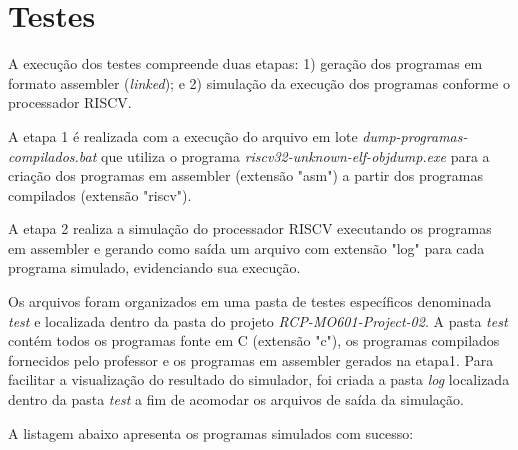 
\section{Testes}

A execução dos testes compreende duas etapas: 1) geração dos programas em formato assembler (\textit{linked}); e 2) simulação da execução dos programas conforme o processador RISCV.

A etapa 1 é realizada com a execução do arquivo em lote \textit{dump-programas-compilados.bat} que utiliza o programa \textit{riscv32-unknown-elf-objdump.exe} para a criação dos programas em assembler (extensão "asm") a partir dos programas compilados (extensão "riscv").

A etapa 2 realiza a simulação do processador RISCV executando os programas em assembler e gerando como saída um arquivo com extensão "log" para cada programa simulado, evidenciando sua execução.

Os arquivos foram organizados em uma pasta de testes específicos denominada \textit{test} e localizada dentro da pasta do projeto \textit{RCP-MO601-Project-02}. A pasta \textit{test} contém todos os programas fonte em C (extensão "c"), os programas compilados fornecidos pelo professor e os programas em assembler gerados na etapa1. Para facilitar a visualização do resultado do simulador, foi criada a pasta \textit{log} localizada dentro da pasta \textit{test} a fim de acomodar os arquivos de saída da simulação.

A listagem abaixo apresenta os programas simulados com sucesso:

